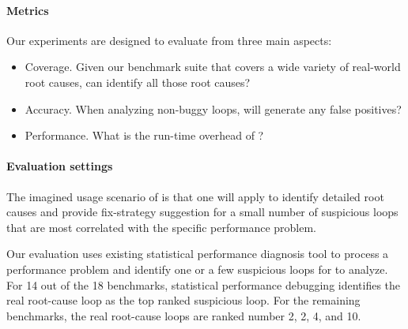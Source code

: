 \paragraph{Metrics}
Our experiments are designed to evaluate \Tool from three main aspects:
\begin{itemize}
\item Coverage. Given our benchmark suite that covers a wide variety
of real-world root causes, can \Tool identify all those root causes?
\vspace{-0.05in}

\item Accuracy. 
When analyzing non-buggy loops, will \Tool generate any false positives?
\vspace{-0.05in}

\item Performance. 
What is the run-time overhead of \Tool?
\end{itemize}

\paragraph{Evaluation settings}
The imagined usage scenario of \Tool is that one will apply \Tool to identify
detailed root causes and provide fix-strategy suggestion for a small number of
suspicious loops that are most correlated with the specific performance problem.

Our evaluation uses existing statistical performance diagnosis
tool \citep{SongOOPSLA2014} to process a performance problem and identify 
one or a few suspicious loops for \Tool to analyze.
For 14 out of the 18 benchmarks, statistical performance debugging identifies the
real root-cause loop as the top ranked suspicious loop. For the remaining
benchmarks, the real root-cause loops are ranked number 2, 2, 4, and 10.

